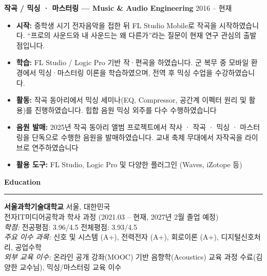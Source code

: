\documentclass[letterpaper,12pt]{article}
\newcommand{\cvsection}[1]{%
    \vspace{15pt}%
    {\Large\bfseries #1}%
    \vspace{3pt}\hrule\vspace{6pt}%
}
\newcommand{\cventry}[2]{%
    \vspace{9pt}%
    \textbf{#1} \hfill #2\par\vspace{2pt}%
}
\begin{document}
\cventry{작곡 / 믹싱 · 마스터링 --- Music \& Audio Engineering}{2016 -- 현재}
\begin{itemize}
    \item \textbf{시작:} 중학생 시기 전자음악을 접한 뒤 FL Studio Mobile로 작곡을 시작하였습니다. ``프로의 사운드와 내 사운드는 왜 다른가''라는 질문이 현재 연구 관심의 출발점입니다.
    \item \textbf{학습:} FL Studio / Logic Pro 기반 작·편곡을 하였습니다. 군 복무 중 모바일 환경에서 믹싱·마스터링 이론을 학습하였으며, 전역 후 믹싱 수업을 수강하였습니다.
    \item \textbf{활동:} 작곡 동아리에서 믹싱 세미나(EQ, Compressor, 공간계 이펙터 원리 및 활용)를 진행하였습니다. 힙합 음원 믹싱 외주를 다수 수행하였습니다
    \item \textbf{음원 발매:} 2025년 작곡 동아리 앨범 프로젝트에서 작사 · 작곡 · 믹싱 · 마스터링을 단독으로 수행한 음원을 발매하였습니다. 교내 축제 무대에서 자작곡을 라이브로 연주하였습니다
    \item \textbf{활용 도구:} FL Studio, Logic Pro 및 다양한 플러그인 (Waves, iZotope 등)
\end{itemize}

\cvsection{Education}
\textbf{서울과학기술대학교} \hfill 서울, 대한민국 \\
전자IT미디어공학과 학사 과정 (2021.03 -- 현재, 2027년 2월 졸업 예정) \\
\textit{학점:} 전공평점: 3.96/4.5 전체평점: 3.93/4.5 \\
\textit{주요 이수 과목:} 신호 및 시스템 (A+), 전력전자 (A+), 회로이론 (A+), 디지털신호처리, 공업수학 \\
\textit{외부 교육 이수:} 온라인 공개 강좌(MOOC) 기반 음향학(Acoustics) 교육 과정 수료(김양한 교수님), 믹싱/마스터링 교육 이수
\end{document}

